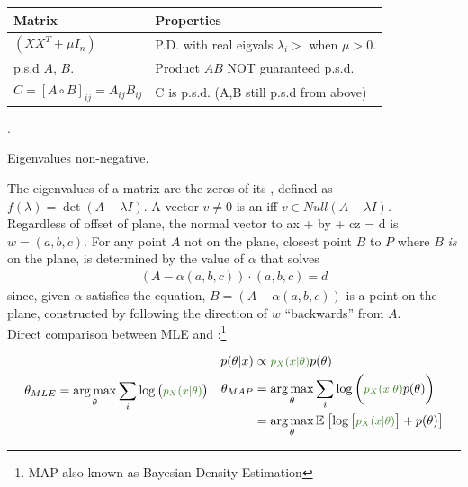 \documentclass[12pt]{article}
\newcommand{\myspace}{\vspace{2\bigskipamount}}
\newcommand\p{\Needspace{10\baselineskip} \noindent}
\begin{document}
\begin{tabular}[h]{l l}
	\toprule\toprule
	Matrix & Properties \\ \midrule
	$\left(XX^T + \mu I_n\right)$ 			& P.D. with real eigvals $\lambda_i > $ when $\mu > 0$.  \\
	p.s.d $A$, $B$.							& Product $AB$ NOT guaranteed p.s.d. \\
	$C = [A \circ B]_{ij} = A_{ij}B_{ij}$	& C is p.s.d. (A,B still p.s.d from above)\\
	\bottomrule\bottomrule
\end{tabular}

\myspace
\p {}. 
\begin{compactitem}
	\item Eigenvalues non-negative.
\end{compactitem}


\p The eigenvalues of a matrix are the zeros of its , defined as $f(\lambda) = \det(A - \lambda I)$. A vector $v \ne 0$ is an  iff $v \in Null(A - \lambda I)$.  \\

\p Regardless of offset of plane, the normal vector to ax + by + cz = d is $w = (a, b, c)$. For any point $A$ not on the plane, closest point $B$ to $P$ where $B$ \textit{is} on the plane, is determined by the value of $\alpha$ that solves
\begin{align}
(A - \alpha (a, b, c)) \cdot (a, b, c) = d
\end{align}
since, given $\alpha$ satisfies the equation, $B = (A - \alpha (a, b, c))$ is a point on the plane, constructed by following the direction of $w$ ``backwards'' from $A$.  \\

\p Direct comparison between MLE and :\footnote{MAP also known as Bayesian Density Estimation}
\begin{footnotesize}
	\begin{align}
	\begin{split}
	\theta_{MLE} &= \argmax_{\theta} \sum_i \log\big( \mgreen{ p_X(x|\theta) } \big) 
	\end{split}
	\begin{split}
	p(\theta|x) &\propto  \mgreen{p_X(x|\theta)}  p(\theta) \\
	\theta_{MAP} &= \argmax_\theta \sum_i \log\bigg(\mgreen{p_X(x|\theta)}p(\theta)\bigg) \\
	&= \argmax_{\theta}  \E{\log\big[\mgreen{p_X(x|\theta)}\big] + p(\theta) }
	\end{split}
	\end{align}
\end{footnotesize}
\end{document}
